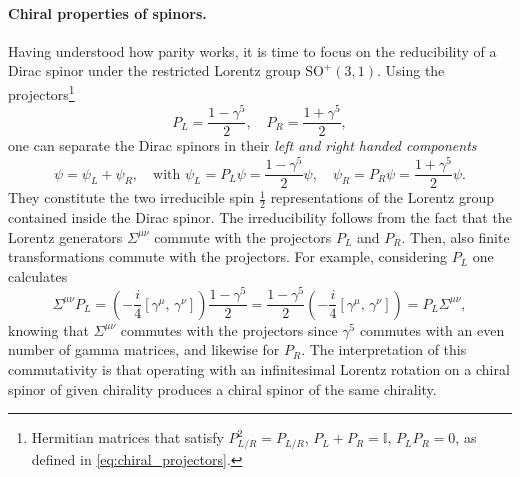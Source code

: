 \paragraph{Chiral properties of spinors.}
Having understood how parity works, it is time to focus on the reducibility of a Dirac spinor under the restricted Lorentz group \(\mathrm{SO}^+(3,1)\). Using the projectors\footnote{Hermitian matrices that satisfy \(P_{L/R}^2 = P_{L/R}\), \(P_L + P_R = \mathbb{I}\), \(P_L P_R = 0\), as defined in \eqref{eq:chiral_projectors}.}
\[
    P_L = \frac{1 - \gamma^5}{2}, \quad P_R = \frac{1 + \gamma^5}{2},
\]
one can separate the Dirac spinors in their \textit{left and right handed components}
\[
    \psi = \psi_L + \psi_R, \quad \text{with } \psi_L = P_L \psi = \frac{1 - \gamma^5}{2} \psi, \quad \psi_R = P_R \psi = \frac{1 + \gamma^5}{2} \psi.
\]
They constitute the two irreducible spin \(\tfrac12\) representations of the Lorentz group contained inside the Dirac spinor. The irreducibility follows from the fact that the Lorentz generators \(\Sigma^{\mu \nu}\) commute with the projectors \(P_L\) and \(P_R\). Then, also finite transformations commute with the projectors. For example, considering \(P_L\) one calculates
\[
    \Sigma^{\mu \nu} P_L = \left(-\frac{i}{4} \left[\gamma^{\mu},\, \gamma^{\nu}\right]\right) \frac{1 - \gamma^5}{2} = \frac{1 - \gamma^5}{2}\left(-\frac{i}{4} \left[\gamma^{\mu},\, \gamma^{\nu}\right]\right) = P_L \Sigma^{\mu \nu},
\]
knowing that \(\Sigma^{\mu \nu}\) commutes with the projectors since \(\gamma^5\) commutes with an even number of gamma matrices, and likewise for \(P_R\). The interpretation of this commutativity is that operating with an infinitesimal Lorentz rotation on a chiral spinor of given chirality produces a chiral spinor of the same chirality.

